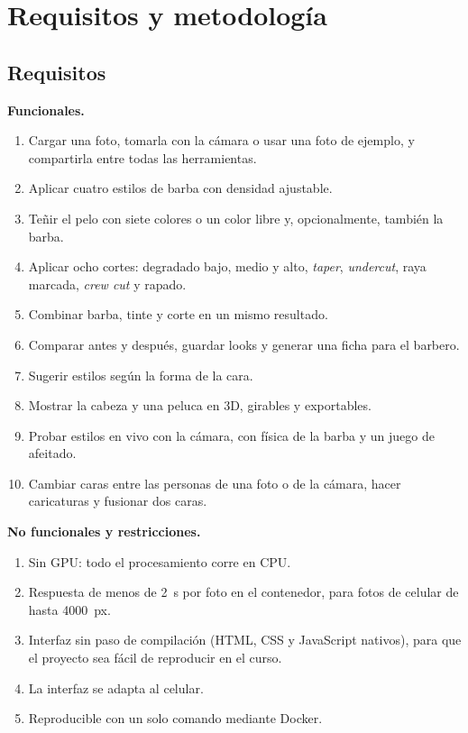 \section{Requisitos y metodología}
\label{sec:metodologia}

\subsection{Requisitos}

\textbf{Funcionales.}
\begin{enumerate}[label=RF\arabic*.]
  \item Cargar una foto, tomarla con la cámara o usar una foto de ejemplo, y compartirla entre todas las herramientas.
  \item Aplicar cuatro estilos de barba con densidad ajustable.
  \item Teñir el pelo con siete colores o un color libre y, opcionalmente, también la barba.
  \item Aplicar ocho cortes: degradado bajo, medio y alto, \emph{taper}, \emph{undercut}, raya marcada, \emph{crew cut} y rapado.
  \item Combinar barba, tinte y corte en un mismo resultado.
  \item Comparar antes y después, guardar looks y generar una ficha para el barbero.
  \item Sugerir estilos según la forma de la cara.
  \item Mostrar la cabeza y una peluca en 3D, girables y exportables.
  \item Probar estilos en vivo con la cámara, con física de la barba y un juego de afeitado.
  \item Cambiar caras entre las personas de una foto o de la cámara, hacer caricaturas y fusionar dos caras.
\end{enumerate}

\textbf{No funcionales y restricciones.}
\begin{enumerate}[label=RNF\arabic*.]
  \item Sin GPU: todo el procesamiento corre en CPU.
  \item Respuesta de menos de 2~s por foto en el contenedor, para fotos de celular de hasta 4000~px.
  \item Interfaz sin paso de compilación (HTML, CSS y JavaScript nativos), para que el proyecto sea fácil de reproducir en el curso.
  \item La interfaz se adapta al celular.
  \item Reproducible con un solo comando mediante Docker.
\end{enumerate}

